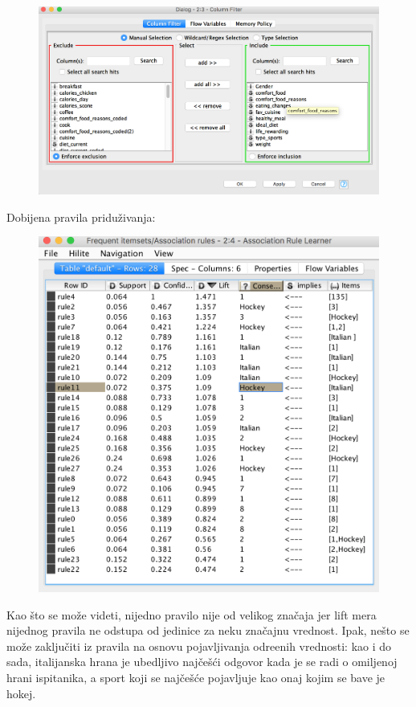 \documentclass[12pt,a4paper]{article}
\begin{document}
\begin{figure}[H]
  \centering
  \includegraphics[width=15cm]{conf}
\end{figure}

\newpage
Dobijena pravila pridu\v zivanja:

\begin{figure}[H]
  \centering
  \includegraphics[width=15cm]{rules}
\end{figure}

Kao \v sto se mo\v ze videti, nijedno pravilo nije od velikog zna\v caja jer lift mera nijednog pravila ne odstupa od jedinice za neku zna\v cajnu vrednost.
Ipak, ne\v sto se mo\v ze zaklju\v citi iz pravila na osnovu pojavljivanja odre\dj enih vrednosti: kao i do sada, italijanska hrana je ubedljivo naj\v ce\v s\' ci odgovor kada je se radi o omiljenoj hrani ispitanika, a sport koji se naj\v ce\v s\' ce pojavljuje kao onaj kojim se bave je hokej. 
\end{document}
